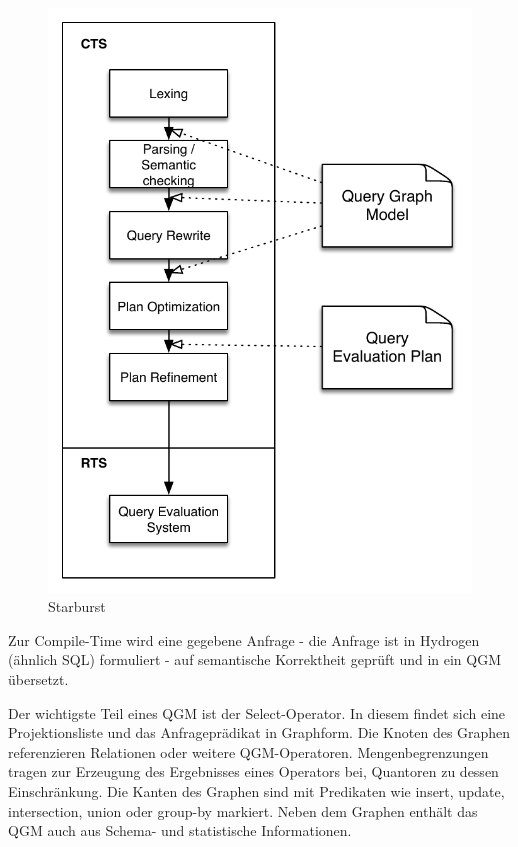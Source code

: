 \begin{figure}[ht]
  \centering
  \includegraphics{02_Related_Work/StarburstFlow.pdf}
  \caption{Starburst}
  \label{StarburstFlow}
\end{figure}

Zur Compile-Time wird eine gegebene Anfrage - die Anfrage ist in Hydrogen (ähnlich SQL) formuliert - auf semantische Korrektheit geprüft und in ein \ac{QGM} übersetzt.

Der wichtigste Teil eines \ac{QGM} ist der Select-Operator. In diesem findet sich eine Projektionsliste und das Anfrageprädikat in Graphform. Die Knoten des Graphen referenzieren Relationen oder weitere \ac{QGM}-Operatoren. Mengenbegrenzungen   tragen zur Erzeugung des Ergebnisses eines Operators bei, Quantoren zu dessen Einschränkung. Die Kanten des Graphen sind mit Predikaten wie insert, update, intersection, union oder group-by markiert. Neben dem Graphen enthält das \ac{QGM} auch aus Schema- und statistische Informationen. 

